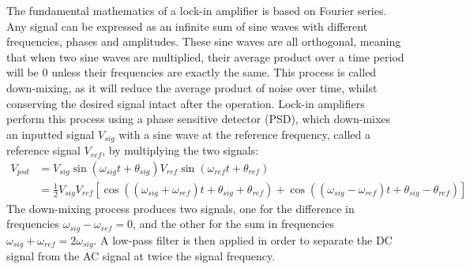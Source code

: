 \documentclass[a4paper,12pt, notitlepage]{article}
\begin{document}
The fundamental mathematics of a lock-in amplifier is based on Fourier series. Any signal can be expressed as an infinite sum of sine waves with different frequencies, phases and amplitudes. These sine waves are all orthogonal, meaning that when two sine waves are multiplied, their average product over a time period will be 0 unless their frequencies are exactly the same. This process is called down-mixing, as it will reduce the average product of noise over time, whilst conserving the desired signal intact after the operation. Lock-in amplifiers perform this process using a phase sensitive detector (PSD), which down-mixes an inputted signal $V_{sig}$ with a sine wave at the reference frequency, called a reference signal $V_{ref}$, by multiplying the two signals:
\begin{align*}
    V_{psd} & = V_{sig}\sin(\omega_{sig}t + \theta_{sig})V_{ref}\sin(\omega_{ref}t + \theta_{ref}) \\
    & = \frac{1}{2}V_{sig}V_{ref}\left[\cos((\omega_{sig}+\omega_{ref})t + \theta_{sig}+\theta_{ref}) + \cos((\omega_{sig}-\omega_{ref})t + \theta_{sig}-\theta_{ref}) \right]
\end{align*}
The down-mixing process produces two signals, one for the difference in frequencies $\omega_{sig}-\omega_{ref}=0$, and the other for the sum in frequencies $\omega_{sig}+\omega_{ref}=2\omega_{sig}$. A low-pass filter is then applied in order to separate the DC signal from the AC signal at twice the signal frequency.
\end{document}
